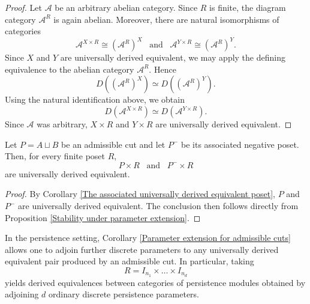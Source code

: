 \begin{proof}
    Let $\mathcal{A}$ be an arbitrary abelian category. Since $R$ is finite, the diagram category $\mathcal{A}^R$ is again abelian. Moreover, there are natural isomorphisms of categories 
    \[\mathcal{A}^{X \times R} \cong (\mathcal{A}^R)^X \,\,\, \text{ and }\,\,\, \mathcal{A}^{Y \times R} \cong (\mathcal{A}^R)^Y.\] Since $X$ and $Y$ are universally derived equivalent, we may apply the defining equivalence to the abelian category $\mathcal{A}^R$. Hence \[D((\mathcal{A}^R)^X) \simeq D((\mathcal{A}^R)^Y).\] Using the natural identification above, we obtain \[D(\mathcal{A}^{X \times R}) \simeq D(\mathcal{A}^{Y \times R}).\] Since $\mathcal{A}$ was arbitrary, $X \times R$ and $Y \times R$ are universally derived equivalent. 
\end{proof}
\begin{corollary} %
\label{Parameter extension for admissible cuts}
    Let $P=A \sqcup B$ be an admissible cut and let $P^-$ be its associated negative poset. Then, for every finite poset $R$, 
    \[P \times R \,\,\, \text{ and } \,\,\, P^- \times R\] are universally derived equivalent.
\end{corollary}

\begin{proof}
    By Corollary \ref{The associated universally derived equivalent poset}, $P$ and $P^-$ are universally derived equivalent. The conclusion then follows directly from Proposition \ref{Stability under parameter extension}.
\end{proof}

In the persistence setting, Corollary \ref{Parameter extension for admissible cuts} allows one to adjoin further discrete parameters to any universally derived equivalent pair produced by an admissible cut. In particular, taking
\[R=I_{n_1} \times \dots \times I_{n_d}\] yields derived equivalences between categories of persistence modules obtained by adjoining $d$ ordinary discrete persistence parameters.

